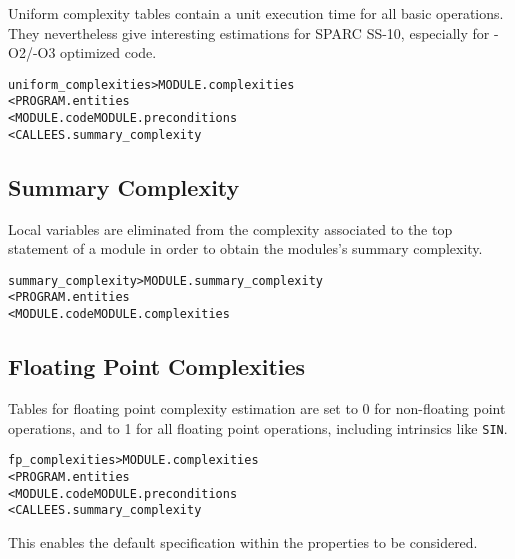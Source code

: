 \documentclass[a4paper]{report}
\newenvironment{PipsMake}{\begin{alltt}}{\end{alltt}}
\begin{document}
Uniform complexity tables contain a unit execution time for all basic
operations. They nevertheless give interesting estimations for SPARC
SS-10, especially for -O2/-O3 optimized code.

\begin{PipsMake}
uniform_complexities                    > MODULE.complexities
        < PROGRAM.entities
        < MODULE.code MODULE.preconditions
        < CALLEES.summary_complexity
\end{PipsMake}

\subsection{Summary Complexity}
\label{subsubsection-summary-complexity}

Local variables are eliminated from the complexity associated to the top
statement of a module in order to obtain the modules's summary complexity.

\begin{PipsMake}
summary_complexity              > MODULE.summary_complexity
        < PROGRAM.entities
        < MODULE.code MODULE.complexities
\end{PipsMake}

\subsection{Floating Point Complexities}
\label{subsubsection-floating-point-complexities}

Tables for floating point complexity estimation are set to 0 for
non-floating point operations, and to 1 for all floating point
operations, including intrinsics like \texttt{SIN}.

\begin{PipsMake}
fp_complexities                    > MODULE.complexities
        < PROGRAM.entities
        < MODULE.code MODULE.preconditions
        < CALLEES.summary_complexity
\end{PipsMake}

This enables the default specification within the properties to
be considered.
\end{document}
